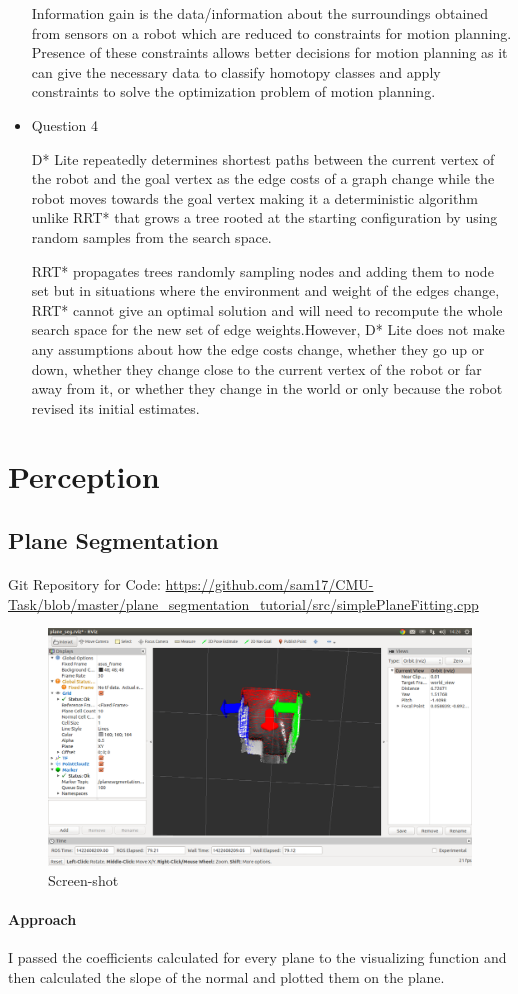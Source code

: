 \documentclass[paper=a4, fontsize=11pt]{scrartcl} %
\numberwithin{equation}{section} %
\numberwithin{figure}{section} %
\numberwithin{table}{section} %
\begin{document}
\begin{itemize}
Information gain is the data/information about the surroundings obtained from sensors on a robot which are reduced to constraints for motion planning. Presence of these constraints allows better decisions for motion planning as it can give the necessary data to classify homotopy classes and apply constraints to solve the optimization problem of motion planning. 
\item Question 4

D* Lite repeatedly determines shortest paths between the current vertex of the robot and the goal vertex as the edge costs of a graph change while the robot moves towards the goal vertex making it a deterministic algorithm unlike RRT* that grows a tree rooted at the starting configuration by using random samples from the search space. 

RRT* propagates trees randomly sampling nodes and adding them to node set but in situations where the environment and weight of the edges change, RRT* cannot give an optimal solution and will need to recompute the whole search space for the new set of edge weights.However, D* Lite does not make any assumptions about how the edge costs change, whether they go up or down, whether they change close to the current vertex of the robot or far away from it, or whether they change in the world or only because the robot revised its initial estimates. 

\end{itemize}

\section{Perception}
\subsection{Plane Segmentation}

\paragraph{}
Git Repository for Code: \url{https://github.com/sam17/CMU-Task/blob/master/plane_segmentation_tutorial/src/simplePlaneFitting.cpp
}

\begin{figure}[b]
\includegraphics[scale = 0.33,bb = 0 0 0 0]{screenshot.png}
\caption{Screen-shot}
\end{figure}

\paragraph{Approach}
I passed the coefficients calculated for every plane to the visualizing function and then calculated the slope of the normal and plotted them on the plane.
\end{document}
